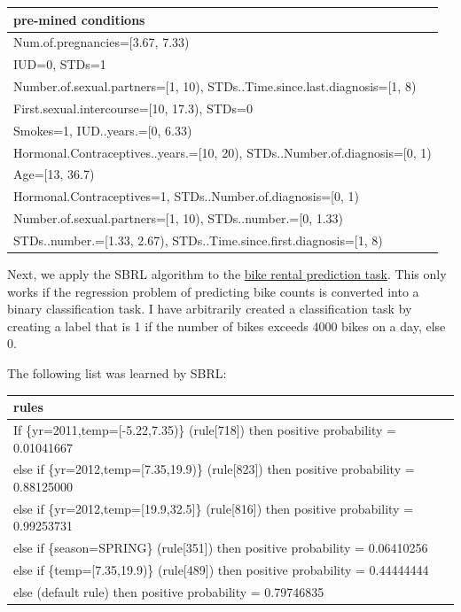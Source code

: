 \documentclass[
  10pt,
]{scrbook}
\begin{document}
\begin{table}
\centering
\begin{tabular}{>{\raggedright\arraybackslash}p{10cm}}
\toprule
pre-mined conditions\\
\midrule
Num.of.pregnancies=[3.67, 7.33)\\
IUD=0, STDs=1\\
Number.of.sexual.partners=[1, 10), STDs..Time.since.last.diagnosis=[1, 8)\\
First.sexual.intercourse=[10, 17.3), STDs=0\\
Smokes=1, IUD..years.=[0, 6.33)\\
\addlinespace
Hormonal.Contraceptives..years.=[10, 20), STDs..Number.of.diagnosis=[0, 1)\\
Age=[13, 36.7)\\
Hormonal.Contraceptives=1, STDs..Number.of.diagnosis=[0, 1)\\
Number.of.sexual.partners=[1, 10), STDs..number.=[0, 1.33)\\
STDs..number.=[1.33, 2.67), STDs..Time.since.first.diagnosis=[1, 8)\\
\bottomrule
\end{tabular}
\end{table}

Next, we apply the SBRL algorithm to the \protect\hyperlink{bike-data}{bike rental prediction task}.
This only works if the regression problem of predicting bike counts is converted into a binary classification task.
I have arbitrarily created a classification task by creating a label that is 1 if the number of bikes exceeds 4000 bikes on a day, else 0.

The following list was learned by SBRL:

\begin{table}
\centering
\begin{tabular}{>{\raggedright\arraybackslash}p{10cm}}
\toprule
rules\\
\midrule
If      \{yr=2011,temp=[-5.22,7.35)\} (rule[718]) then positive probability = 0.01041667\\
else if \{yr=2012,temp=[7.35,19.9)\} (rule[823]) then positive probability = 0.88125000\\
else if \{yr=2012,temp=[19.9,32.5]\} (rule[816]) then positive probability = 0.99253731\\
else if \{season=SPRING\} (rule[351]) then positive probability = 0.06410256\\
else if \{temp=[7.35,19.9)\} (rule[489]) then positive probability = 0.44444444\\
\addlinespace
else  (default rule)  then positive probability = 0.79746835\\
\bottomrule
\end{tabular}
\end{table}
\end{document}
